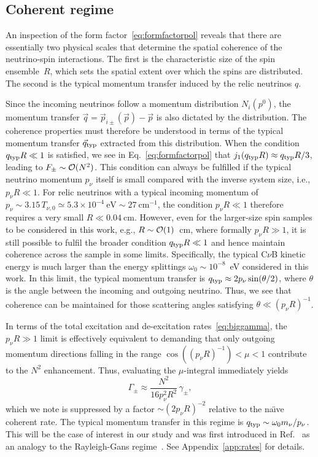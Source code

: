 \documentclass[aps,prd,10pt,twocolumn,superscriptaddress,floatfix,nofootinbib,amsmath,amssymb,altaffilletter,preprintnumbers]{revtex4-1}
\begin{document}
\subsection{Coherent regime}
An inspection of the form factor~\eqref{eq:formfactorpol} reveals that there are essentially two physical scales that determine the spatial coherence of the neutrino-spin interactions. The first is the characteristic size of the spin ensemble~$R$, which sets the spatial extent over which the spins are distributed. The second is the typical momentum transfer induced by the relic neutrinos $q$. 

Since the incoming neutrinos follow a momentum distribution $N_i(p^0)$, the momentum transfer $\vec{q}=\vec{p}_{i\pm}(\vec{p})-\vec{p}$ is also dictated by the distribution. The coherence properties must therefore be understood in terms of the typical momentum transfer ${}\vec{q}_{\rm typ}$  extracted from this distribution.
When the condition $q_{\rm typ}R\ll 1$ is satisfied, we see in Eq.~\eqref{eq:formfactorpol} that $j_1(q_{\rm typ}R)\approx  q_{\rm typ} R/3$, leading to $F_{\pm}\sim {\cal O}(N^2)$. 
This condition can always be fulfilled if the typical neutrino momentum $p_\nu$  itself is small compared with the inverse system size, i.e., $p_{\nu} R \ll1$. For relic neutrinos with a typical incoming momentum of $p_{\nu} \sim 3.15\, T_{\nu,0} \simeq 5.3 \times 10^{-4}~\mathrm{eV} \sim 27~\mathrm{cm
}^{-1}$, the condition $p_\nu R\ll 1$ therefore requires a very small $R \ll 0.04~\mathrm{cm}$. However, even for the larger-size spin samples to be considered in this work, e.g., $R \sim {\cal O}(1)$~cm, where formally $p_\nu R \gg 1$, it is still possible to fulfil the broader condition $q_{\rm typ} R \ll 1$ and hence maintain coherence across the sample in some limits. Specifically, the typical C$\nu$B kinetic energy is much larger than the energy splittings $\omega_0 \sim 10^{-8}$~eV considered in this work.  In this limit, the typical momentum transfer is $q_{\rm typ}\approx 2p_\nu\sin(\theta/2)$, where $\theta$ is the angle between the incoming and outgoing neutrino.  Thus, we see that coherence can be maintained for those scattering angles satisfying $\theta \ll (p_\nu R)^{-1}$.

In terms of the total excitation and de-excitation rates~\eqref{eq:biggamma}, the $p_\nu R \gg 1$ limit is effectively equivalent to demanding that only  
outgoing momentum  directions falling in the range $\cos ((p_\nu R)^{-1})<\mu<1$ contribute to the $N^2$ enhancement.  Thus, evaluating the $\mu$-integral immediately yields \begin{equation}
\Gamma_\pm \approx \frac{N^2}{16p^2_\nu R^2} \, \gamma_\pm,
\label{eq:partial}
\end{equation}
which we note is suppressed by a factor $\sim (2 p_\nu R)^{-2}$ relative to the na\"{\i}ve coherent rate. The typical momentum transfer in this regime is $q_{\rm typ} \sim \omega_0 m_\nu/p_\nu$.   This will be the case of interest in our study and was first introduced in Ref.~\cite{Arvanitaki:2024taq} as an analogy to the Rayleigh-Gans regime~\cite{1925AnP...381...29G}.  See Appendix~\ref{app:rates} for details.
\end{document}
